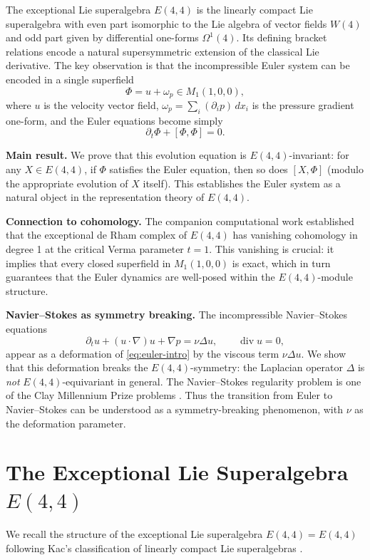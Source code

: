 \documentclass[reqno,10pt]{amsart}
\theoremstyle{plain}
\theoremstyle{definition}
\def\gE{E(4,4)}
\def\div{\operatorname{div}}
\begin{document}
The exceptional Lie superalgebra $\gE$ is the linearly compact Lie superalgebra with even part isomorphic to the Lie algebra of vector fields $W(4)$ and odd part given by differential one-forms $\Omega^1(4)$. Its defining bracket relations encode a natural supersymmetric extension of the classical Lie derivative. The key observation is that the incompressible Euler system can be encoded in a single superfield
\[
  \Phi = u + \omega_p \in M_1(1,0,0),
\]
where $u$ is the velocity vector field, $\omega_p = \sum_i (\partial_i p)\,dx_i$ is the pressure gradient one-form, and the Euler equations become simply
\[
  \partial_t \Phi + [\Phi,\Phi] = 0.
\]

\textbf{Main result.} We prove that this evolution equation is $\gE$-invariant: for any $X\in\gE$, if $\Phi$ satisfies the Euler equation, then so does $[X,\Phi]$ (modulo the appropriate evolution of $X$ itself). This establishes the Euler system as a natural object in the representation theory of $\gE$.

\textbf{Connection to cohomology.} The companion computational work\cite{CCK2016} established that the exceptional de Rham complex of $\gE$ has vanishing cohomology in degree 1 at the critical Verma parameter $t=1$. This vanishing is crucial: it implies that every closed superfield in $M_1(1,0,0)$ is exact, which in turn guarantees that the Euler dynamics are well-posed within the $\gE$-module structure.

\textbf{Navier--Stokes as symmetry breaking.} The incompressible Navier--Stokes equations \cite{Evans2010}
\begin{equation}\label{eq:ns-intro}
  \partial_t u + (u\cdot\nabla)u + \nabla p = \nu\Delta u,
  \qquad \div u = 0,
\end{equation}
appear as a deformation of \eqref{eq:euler-intro} by the viscous term $\nu\Delta u$. We show that this deformation breaks the $\gE$-symmetry: the Laplacian operator $\Delta$ is \emph{not} $\gE$-equivariant in general. The Navier--Stokes regularity problem is one of the Clay Millennium Prize problems \cite{ClayInstitute2000}. Thus the transition from Euler to Navier--Stokes can be understood as a symmetry-breaking phenomenon, with $\nu$ as the deformation parameter.

\section{The Exceptional Lie Superalgebra $E(4,4)$}

We recall the structure of the exceptional Lie superalgebra $\gE = E(4,4)$ following Kac's classification of linearly compact Lie superalgebras \cite{Kac1977,Kac1977b}.
\end{document}
